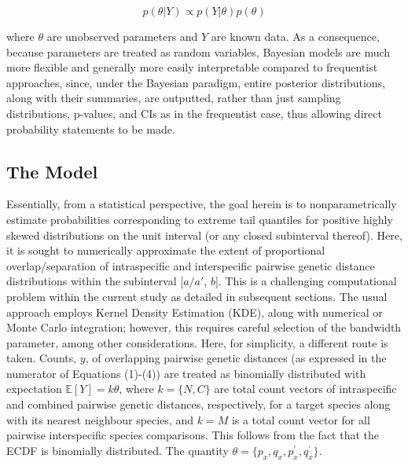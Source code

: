 \documentclass[12pt]{article}
\begin{document}
\begin{equation}
p(\theta | Y) \propto p(Y | \theta)p(\theta)
\end{equation}


\noindent where $\theta$ are unobserved parameters and $Y$ are known data.  As a consequence, because parameters are treated as random variables, Bayesian models are much more flexible and generally more easily interpretable compared to frequentist approaches, since, under the Bayesian paradigm, entire posterior distributions, along with their summaries, are outputted, rather than just sampling distributions, p-values, and CIs as in the frequentist case, thus allowing direct probability statements to be made. 

\subsection{The Model}

Essentially, from a statistical perspective, the goal herein is to nonparametrically estimate probabilities corresponding to extreme tail quantiles for positive highly skewed distributions on the unit interval  (or any closed subinterval thereof). Here, it is sought to numerically approximate the extent of proportional overlap/separation of intraspecific and interspecific pairwise genetic distance distributions within the subinterval [$a/a'$, $b$]. This is a challenging computational problem within the current study as detailed in subsequent sections. The usual approach employs Kernel Density Estimation (KDE), along with numerical or Monte Carlo integration; however, this requires careful selection of the bandwidth parameter, among other considerations. Here, for simplicity, a different route is taken. Counts, $y$, of overlapping pairwise genetic distances (as expressed in the numerator of Equations (1)-(4)) are treated as binomially distributed with expectation $\mathbb{E}[Y] = k\theta$, where $k = \{N, C\}$ are total count vectors of intraspecific and combined pairwise genetic distances, respectively, for a target species along with its nearest neighbour species, and $k = M$ is a total count vector for all pairwise interspecific species comparisons. This follows from the fact that the ECDF is binomially distributed. The quantity $\theta = \{p_x, q_x, p^{'}_x, q^{'}_x\}$. 
\end{document}
